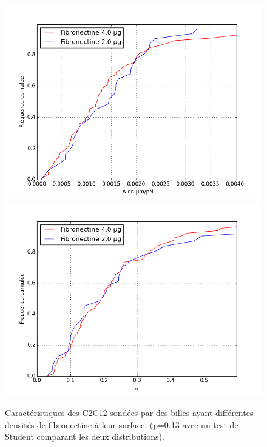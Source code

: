 \documentclass                                                                                                                                                                                                                                                                                                                                       {report}
\begin{document}
\begin{figure}[p]
\includegraphics[scale=0.5]{Figures/A_coating_seul.png} 
\includegraphics[scale=0.5]{Figures/E_coating_seul.png} 
\caption{Caractéristiques des C2C12 sondées par des billes ayant différentes densités de fibronectine à leur surface. (p=0.13 avec un test de Student comparant les deux distributions). }
\end{figure}
\end{document}
